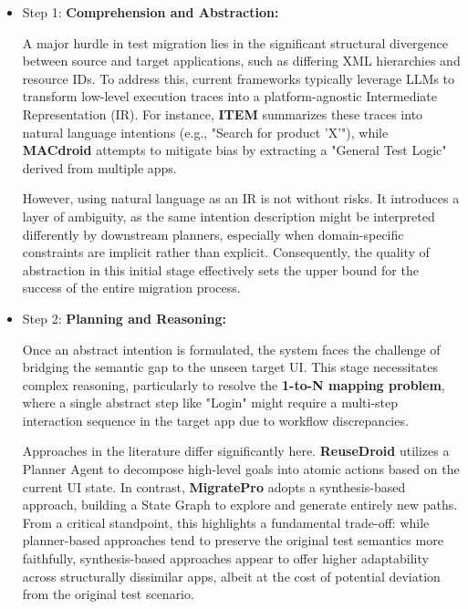 \documentclass[acmsmall,nonacm]{acmart}
\begin{document}
\begin{itemize}
    \item Step 1: \textbf{Comprehension and Abstraction:
    }
    
    A major hurdle in test migration lies in the significant structural divergence between source and target applications, such as differing XML hierarchies and resource IDs. To address this, current frameworks typically leverage LLMs to transform low-level execution traces into a platform-agnostic Intermediate Representation (IR). For instance, \textbf{ITEM} \cite{10.1145/3728978} summarizes these traces into natural language intentions (e.g., "Search for product 'X'"), while \textbf{MACdroid} \cite{10.1145/3726525} attempts to mitigate bias by extracting a "General Test Logic" derived from multiple apps.

    However, using natural language as an IR is not without risks. It introduces a layer of ambiguity, as the same intention description might be interpreted differently by downstream planners, especially when domain-specific constraints are implicit rather than explicit. Consequently, the quality of abstraction in this initial stage effectively sets the upper bound for the success of the entire migration process.

    
    \item Step 2: \textbf{Planning and Reasoning: } 
    
    Once an abstract intention is formulated, the system faces the challenge of bridging the semantic gap to the unseen target UI. This stage necessitates complex reasoning, particularly to resolve the \textbf{1-to-N mapping problem}, where a single abstract step like "Login" might require a multi-step interaction sequence in the target app due to workflow discrepancies.

    Approaches in the literature differ significantly here. \textbf{ReuseDroid} \cite{li2025reusedroidvlmempoweredandroidui} utilizes a Planner Agent to decompose high-level goals into atomic actions based on the current UI state. In contrast, \textbf{MigratePro} adopts a synthesis-based approach, building a State Graph to explore and generate entirely new paths. From a critical standpoint, this highlights a fundamental trade-off: while planner-based approaches tend to preserve the original test semantics more faithfully, synthesis-based approaches appear to offer higher adaptability across structurally dissimilar apps, albeit at the cost of potential deviation from the original test scenario.


\end{itemize}
\end{document}

